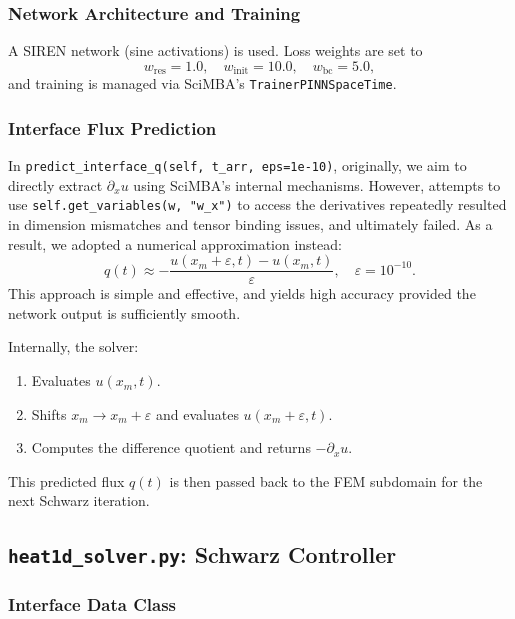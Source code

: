 \documentclass[12pt]{article}
\begin{document}
\subsubsection{Network Architecture and Training}

A SIREN network (sine activations) is used.  Loss weights are set to
\begin{equation}
  w_{\mathrm{res}}=1.0,\quad
  w_{\mathrm{init}}=10.0,\quad
  w_{\mathrm{bc}}=5.0,
\end{equation}
and training is managed via SciMBA’s \texttt{TrainerPINNSpaceTime}.

\subsubsection{Interface Flux Prediction}

In \texttt{predict\_interface\_q(self, t\_arr, eps=1e-10)}, originally, we aim to directly extract $\partial_x u$ using SciMBA’s internal mechanisms. However, attempts to use \texttt{self.get\_variables(w, "w\_x")} to access the derivatives repeatedly resulted in dimension mismatches and tensor binding issues, and ultimately failed. As a result, we adopted a numerical approximation instead: 
\begin{equation}
  q(t)\approx
    -\frac{u(x_m+\varepsilon,t)-u(x_m,t)}{\varepsilon},
  \quad \varepsilon=10^{-10}.
\end{equation}
This approach is simple and effective, and yields high accuracy provided the network output is sufficiently smooth.

Internally, the solver:
\begin{enumerate}
  \item Evaluates \(u(x_m,t)\).
  \item Shifts \(x_m\to x_m+\varepsilon\) and evaluates \(u(x_m+\varepsilon,t)\).
  \item Computes the difference quotient and returns \(-\partial_x u\).
\end{enumerate}

This predicted flux \(q(t)\) is then passed back to the FEM subdomain for the next Schwarz iteration.


\subsection{\texttt{heat1d\_solver.py}: Schwarz Controller}

\subsubsection{Interface Data Class}
\end{document}
